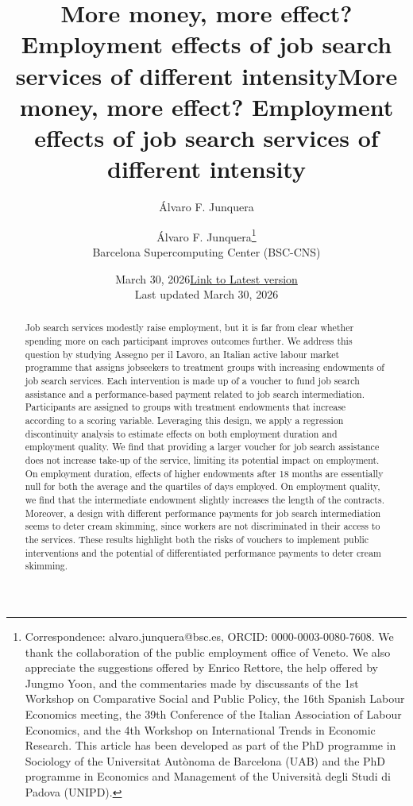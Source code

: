 \documentclass[
  11pt]{article}
\title{More money, more effect? Employment effects of job search
services of different intensity}
\author{Álvaro F. Junquera}
\date{March 30, 2026}
\begin{document}
\def\spacingset#1{\renewcommand{\baselinestretch}%
{#1}\small\normalsize} \spacingset{1}



\date{\href{https://osf.io/preprints/socarxiv/rjshu}{Link to Latest version}\\ \vspace{1em}  Last updated March
30, 2026}
\title{More money, more effect? Employment effects of job search
services of different intensity}
\author{
Álvaro F. Junquera\thanks{Correspondence: alvaro.junquera@bsc.es, ORCID:
0000-0003-0080-7608. We thank the collaboration of the public employment
office of Veneto. We also appreciate the suggestions offered by Enrico
Rettore, the help offered by Jungmo Yoon, and the commentaries made by
discussants of the 1st Workshop on Comparative Social and Public Policy,
the 16th Spanish Labour Economics meeting, the 39th Conference of the
Italian Association of Labour Economics, and the 4th Workshop on
International Trends in Economic Research. This article has been
developed as part of the PhD programme in Sociology of the Universitat
Autònoma de Barcelona (UAB) and the PhD programme in Economics and
Management of the Università degli Studi di Padova (UNIPD).}\\
Barcelona Supercomputing Center (BSC-CNS)\\
}
\maketitle

\bigskip
\bigskip
\begin{abstract}
Job search services modestly raise employment, but it is far from clear
whether spending more on each participant improves outcomes further. We
address this question by studying Assegno per il Lavoro, an Italian
active labour market programme that assigns jobseekers to treatment
groups with increasing endowments of job search services. Each
intervention is made up of a voucher to fund job search assistance and a
performance-based payment related to job search intermediation.
Participants are assigned to groups with treatment endowments that
increase according to a scoring variable. Leveraging this design, we
apply a regression discontinuity analysis to estimate effects on both
employment duration and employment quality. We find that providing a
larger voucher for job search assistance does not increase take-up of
the service, limiting its potential impact on employment. On employment
duration, effects of higher endowments after 18 months are essentially
null for both the average and the quartiles of days employed. On
employment quality, we find that the intermediate endowment slightly
increases the length of the contracts. Moreover, a design with different
performance payments for job search intermediation seems to deter cream
skimming, since workers are not discriminated in their access to the
services. These results highlight both the risks of vouchers to
implement public interventions and the potential of differentiated
performance payments to deter cream skimming.
\end{abstract}
\end{document}
